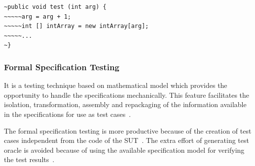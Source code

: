 \begin{lstlisting}
~public void test (int arg) {
~~~~~arg = arg + 1;
~~~~~int [] intArray = new intArray[arg];
~~~~~...
~}
\end{lstlisting}



\subsubsection{Formal Specification Testing}
It is a testing technique based on mathematical model which provides the opportunity to handle the specifications mechanically. This feature facilitates the isolation, transformation, assembly and repackaging of the information available in the specifications for use as test cases~\cite{donat1997automating}.

The formal specification testing is more productive because of the creation of test cases independent from the code of the SUT~\cite{gaudel2010software}. The extra effort of generating test oracle is avoided because of using the available specification model for verifying the test results~\cite{bertolino2007software}.
  







